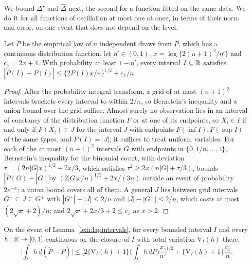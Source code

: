 We bound $\Delta^\star$ and $\widehat\Delta$ next, the second for a function fitted on the same data. We do it for
all functions of oscillation at most one at once, in terms of their norm and error, on one event that does not depend
on the level.

\begin{lemma}[Intervals]
\label{lem:lapintervals}
Let $\tilde P$ be the empirical law of $n$ independent draws from $P$, which has a continuous distribution function,
let $\eta'\in(0,1)$, $x=\log\{2(n+1)^2/\eta'\}$ and $c_x=2x+4$. With probability at least $1-\eta'$, every interval
$I\subseteq\mathbb{R}$ satisfies $|\tilde P(I)-P(I)|\le\{2P(I)x/n\}^{1/2}+c_x/n$.
\end{lemma}

\begin{proof}
After the probability integral transform, a grid of at most $(n+1)^2$ intervals brackets every interval to within
$2/n$, so Bernstein's inequality and a union bound over the grid suffice. Almost surely no observation lies in an interval of
constancy of the distribution function $F$ or at one of its endpoints, so $X_i\in I$ if and only if $F(X_i)\in J$ for the interval $J$ with endpoints $F(\inf I),F(\sup I)$ of the
same types, and $P(I)=|J|$; it suffices to treat uniform variables. For each of the at most $(n+1)^2$ intervals $G$ with
endpoints in $\{0,1/n,\dots,1\}$, Bernstein's inequality \citep[Section~2.8]{boucheron2013concentration} for the binomial
count, with deviation $\tau=(2n|G|x)^{1/2}+2x/3$, which satisfies $\tau^2\ge2x(n|G|+\tau/3)$, bounds
$|\tilde P(G)-|G||$ by $(2|G|x/n)^{1/2}+2x/(3n)$ outside an event of probability $2e^{-x}$; a union bound covers all of
them. A general $J$ lies between grid intervals $G^-\subseteq J\subseteq G^+$ with $|G^+|-|J|\le2/n$ and $|J|-|G^-|\le2/n$,
which costs at most $(2\sqrt x+2)/n$; and $2\sqrt x+2x/3+2\le c_x$ as $x>2$.
\end{proof}

\begin{lemma}
\label{lem:lapbv}
On the event of Lemma~\ref{lem:lapintervals}, for every bounded interval $I$ and every $h:\mathbb{R}\to[0,1]$ continuous on
the closure of $I$ with total variation $\mathrm V_I(h)$ there,
\[
\Big|\int_Ih\,d(\tilde P-P)\Big|\le\Big[2\{\mathrm V_I(h)+1\}\Big(\int_Ih\,dP\Big)\frac xn\Big]^{1/2}+\{\mathrm V_I(h)+1\}\frac{c_x}n .
\]
\end{lemma}

